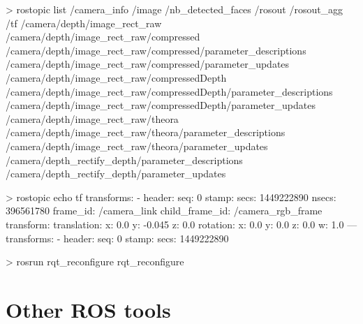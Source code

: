 \documentclass[compress]{beamer}
\begin{document}
\begin{frame}[containsverbatim]{}
\begin{shcode}
> rostopic list
/camera_info
/image
/nb_detected_faces
/rosout
/rosout_agg
/tf
/camera/depth/image_rect_raw
/camera/depth/image_rect_raw/compressed
/camera/depth/image_rect_raw/compressed/parameter_descriptions
/camera/depth/image_rect_raw/compressed/parameter_updates
/camera/depth/image_rect_raw/compressedDepth
/camera/depth/image_rect_raw/compressedDepth/parameter_descriptions
/camera/depth/image_rect_raw/compressedDepth/parameter_updates
/camera/depth/image_rect_raw/theora
/camera/depth/image_rect_raw/theora/parameter_descriptions
/camera/depth/image_rect_raw/theora/parameter_updates
/camera/depth_rectify_depth/parameter_descriptions
/camera/depth_rectify_depth/parameter_updates
\end{shcode}

\end{frame}

\begin{frame}[containsverbatim]{}
\begin{shcode}
> rostopic echo tf
transforms: 
  - 
    header: 
      seq: 0
      stamp: 
        secs: 1449222890
        nsecs: 396561780
      frame_id: /camera_link
    child_frame_id: /camera_rgb_frame
    transform: 
      translation: 
        x: 0.0
        y: -0.045
        z: 0.0
      rotation: 
        x: 0.0
        y: 0.0
        z: 0.0
        w: 1.0
---
transforms: 
  - 
    header: 
      seq: 0
      stamp: 
        secs: 1449222890

\end{shcode}

\end{frame}


\begin{frame}[containsverbatim]{}

\begin{shcode}
> rosrun rqt_reconfigure rqt_reconfigure
\end{shcode}

\end{frame}





\section{Other ROS tools}
\end{document}
